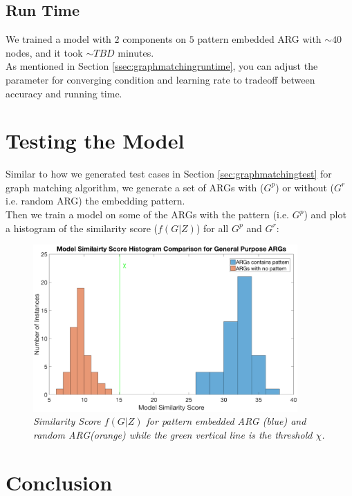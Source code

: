 \subsection{Run Time}

We trained a model with $2$ components on $5$ pattern embedded ARG with $\sim40$ nodes, and it took $\sim TBD$ minutes.\\

As mentioned in Section \ref{ssec:graphmatchingruntime}, you can adjust the parameter for converging condition and learning rate to tradeoff between accuracy and running time.

\section{Testing the Model}

Similar to how we generated test cases in Section \ref{sec:graphmatchingtest} for graph matching algorithm, we generate a set of ARGs with ($G^p$) or without ($G^r$ i.e. random ARG) the embedding pattern. \\

Then we train a model on some of the ARGs with the pattern (i.e. $G^p$) and plot a histogram of the similarity score ($f(G|Z)$) for all $G^p$ and $G^r$:

\begin{figure}[h]
	\centering
	\captionsetup{justification=centering}
	\includegraphics[width=0.9\textwidth]{figs/pattern_learning.png}
	\caption[Caption for LOF]{\emph{Similarity Score $f(G|Z)$ for pattern embedded ARG (blue) and random ARG(orange) while the green vertical line is the threshold $\chi$.}}
	\label{fig:pattern_learning}
\end{figure}

\section{Conclusion}

